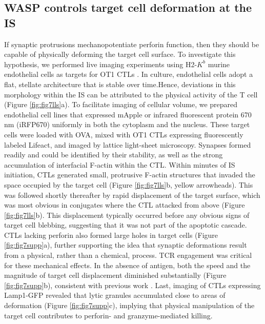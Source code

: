 \subsection{WASP controls target cell deformation at the IS}
If synaptic protrusions mechanopotentiate perforin function, then they should be capable of physically deforming the target cell surface. To investigate this hypothesis, we performed live imaging experiments using H2-$K^{b}$ murine endothelial cells as targets for OT1 CTLs \cite{Sage2012, Kumari2015}. In culture, endothelial cells adopt a flat, stellate architecture that is stable over time.Hence, deviations in this morphology within the IS can be attributed to the physical activity of the T cell (Figure \ref{fig:fig7lls}a). To facilitate imaging of cellular volume, we prepared endothelial cell lines that expressed mApple or infrared fluorescent protein 670 nm (iRFP670) uniformly in both the cytoplasm and the nucleus. These target cells were loaded with OVA, mixed with OT1 CTLs expressing fluorescently labeled Lifeact, and imaged by lattice light-sheet microscopy. Synapses formed readily and could be identified by their stability, as well as the strong accumulation of interfacial F-actin within the CTL. Within minutes of IS initiation, CTLs generated small, protrusive F-actin structures that invaded the space occupied by the target cell (Figure \ref{fig:fig7lls}b, yellow arrowheads). This was followed shortly thereafter by rapid displacement of the target surface, which was most obvious in conjugates where the CTL attacked from above (Figure \ref{fig:fig7lls}b). This displacement typically occurred before any obvious signs of target cell blebbing, suggesting that it was not part of the apoptotic cascade. CTLs lacking perforin also formed large holes in target cells (Figure \ref{fig:fig7supp}a), further supporting the idea that synaptic deformations result from a physical, rather than a chemical, process. TCR engagement was critical for these mechanical effects. In the absence of antigen, both the speed and the magnitude of target cell displacement diminished substantially (Figure \ref{fig:fig7supp}b), consistent with previous work \cite{Sage2012}. Last, imaging of CTLs expressing Lamp1-GFP revealed that lytic granules accumulated close to areas of deformation (Figure \ref{fig:fig7supp}c), implying that physical manipulation of the target cell contributes to perforin- and granzyme-mediated killing.

